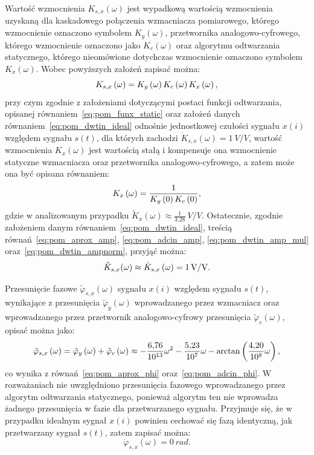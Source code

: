 Wartość wzmocnienia $K_{s,x}(\omega)$ jest wypadkową wartością wzmocnienia uzyskaną dla kaskadowego połączenia wzmacniacza pomiarowego, którego wzmocnienie oznaczono symbolem $K_{y}(\omega)$, przetwornika analogowo-cyfrowego, którego wzmocnienie oznaczono jako $K_{c}(\omega)$ oraz algorytmu odtwarzania statycznego, którego nieomówione dotychczas wzmocnienie oznaczono symbolem $K_{x}(\omega)$. Wobec powyższych założeń zapisać można:
\begin{equation}
K_{s,x} \left(\omega\right) = K_{y} \left(\omega\right) K_{c} \left(\omega\right) K_{x} \left(\omega\right) \label{eq:pom_dwtin_amp_mul},
\end{equation}
przy czym zgodnie z założeniami dotyczącymi postaci funkcji odtwarzania, opisanej równaniem~\eqref{eq:pom_funx_static} oraz założeń danych równaniem~\eqref{eq:pom_dwtin_ideal} odnośnie jednostkowej czułości sygnału $x(i)$ względem sygnału $s(t)$, dla których zachodzi $\dot{K}_{s,x}(\omega) = \qty{1}{V \per V}$, wartość wzmocnienia $K_{x}(\omega)$ jest wartością stałą i kompensuje ona wzmocnienie statyczne wzmacniacza oraz przetwornika analogowo-cyfrowego, a zatem może ona być opisana równaniem:
\begin{equation}
K_{x} \left(\omega\right) = \frac{1}{K_{y} \left(0\right) K_{c} \left(0\right)} \label{eq:pom_dwtin_ampnorm},
\end{equation}
gdzie w analizowanym przypadku $\tilde{K}_{x}(\omega) \approx \frac{1}{\num{3.28}}~\unit{V \per V}$. Ostatecznie, zgodnie założeniem danym równaniem~\eqref{eq:pom_dwtin_ideal}, treścią równań~\eqref{eq:pom_aprox_amp}, \eqref{eq:pom_adcin_amp}, \eqref{eq:pom_dwtin_amp_mul} oraz~\eqref{eq:pom_dwtin_ampnorm}, przyjąć można:
\begin{equation}
\tilde{K}_{s,x}(\omega) \approx \dot{K}_{s,x} \left(\omega\right) = \qty{1}{V \per V} \label{eq:pom_dwtin_amp}.
\end{equation}

Przesunięcie fazowe $\tilde{\varphi}_{s,x}(\omega)$ sygnału $x(i)$ względem sygnału $s(t)$, wynikające z przesunięcia $\tilde{\varphi}_{y}(\omega)$ wprowadzanego przez wzmacniacz oraz wprowadzanego przez przetwornik analogowo-cyfrowy przesunięcia $\tilde{\varphi}_{c}(\omega)$, opisać można jako:
\begin{equation}
\tilde{\varphi}_{s,x} \left(\omega\right) = \tilde{\varphi}_{y} \left(\omega\right) + \tilde{\varphi}_{c} \left(\omega\right) \approx -\frac{\num{6.76}}{\num{e13}} \omega^{2} - \frac{\num{5.23}}{\num{e07}} \omega - \arctan \left(\frac{\num{4.20}}{\num{e8}} \omega\right) \label{eq:pom_dwtin_phi},
\end{equation}
co wynika z równań~\eqref{eq:pom_aprox_phi} oraz~\eqref{eq:pom_adcin_phi}. W rozważaniach nie uwzględniono przesunięcia fazowego wprowadzanego przez algorytm odtwarzania statycznego, ponieważ algorytm ten nie wprowadza żadnego przesunięcia w fazie dla przetwarzanego sygnału. Przyjmuje się, że w przypadku idealnym sygnał $x(i)$ powinien cechować się fazą identyczną, jak przetwarzany sygnał $s(t)$, zatem zapisać można:
\begin{equation}
\dot{\varphi}_{s,x}(\omega) = \qty{0}{rad} \label{eq:pom_dwtin_phiideal}.
\end{equation}

